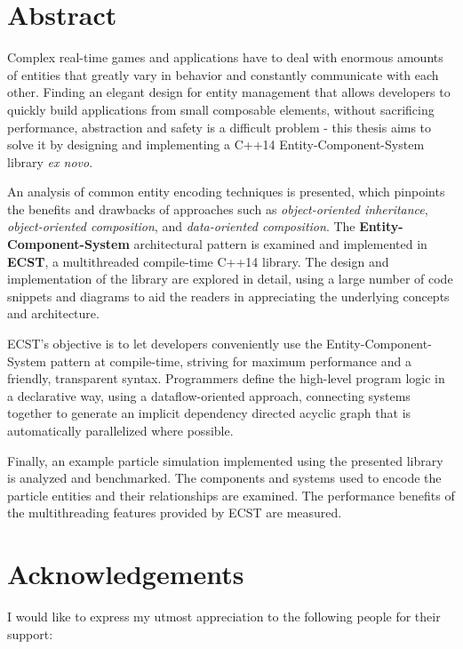 \documentclass[oneside, 12pt, a4paper, openany]{book}
\begin{document}
\chapter*{Abstract}\label{abstract}

Complex real-time games and applications have to deal with enormous
amounts of entities that greatly vary in behavior and constantly
communicate with each other. Finding an elegant design for entity
management that allows developers to quickly build applications from
small composable elements, without sacrificing performance, abstraction
and safety is a difficult problem - this thesis aims to solve it by
designing and implementing a C++14 Entity-Component-System library
\emph{ex novo}.

An analysis of common entity encoding techniques is presented, which
pinpoints the benefits and drawbacks of approaches such as
\emph{object-oriented inheritance}, \emph{object-oriented composition},
and \emph{data-oriented composition}. The
\textbf{Entity-Component-System} architectural pattern is examined and
implemented in \textbf{ECST}, a multithreaded compile-time C++14
library. The design and implementation of the library are explored in
detail, using a large number of code snippets and diagrams to aid the
readers in appreciating the underlying concepts and architecture.

ECST's objective is to let developers conveniently use the
Entity-Component-System pattern at compile-time, striving for maximum
performance and a friendly, transparent syntax. Programmers define the
high-level program logic in a declarative way, using a dataflow-oriented
approach, connecting systems together to generate an implicit dependency
directed acyclic graph that is automatically parallelized where
possible.

Finally, an example particle simulation implemented using the presented
library is analyzed and benchmarked. The components and systems used to
encode the particle entities and their relationships are examined. The
performance benefits of the multithreading features provided by ECST are
measured.

\chapter*{Acknowledgements}\label{acknowledgements}

I would like to express my utmost appreciation to the following people
for their support:
\end{document}
